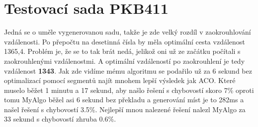 \begin{table}[H]
\caption{QA194 -- MyAlgo}
\centering
{}
\end{table}

\section{Testovací sada PKB411}
Jedná se o uměle vygenerovanou sadu, takže je zde velký rozdíl v zaokrouhlování vzdálenosti. Po přepočtu na desetinná čísla by  měla optimální cesta vzdálenost 1365,4. Problém je, že se to tak brát nedá, jelikož oni už ze začátku počítali s zaokrouhlenými vzdálenostmi. A optimální vzdáleností po zaokrouhlení je tedy vzdálenost \textbf{1343}. Jak zde vidíme mému algoritmu se podařilo už za 6 sekund bez optimalizací pomocí segmentů najít mnohem lepší výsledek jak ACO. Které muselo běžet 1 minutu a 17 sekund, aby našlo řešení s chybovostí skoro 7\% oproti tomu MyAlgo běžel asi 6 sekund bez překladu a generování míst je to 282ms a našel řešení s chybovostí 3.5\%. Nejlepší mnou nalezené řešení nalezl MyAlgo za 33 sekund s chybovostí zhruba 0.6\%. 

